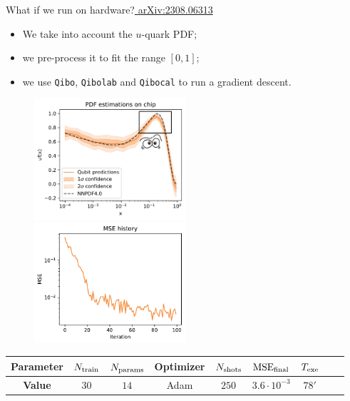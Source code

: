 \documentclass[8pt, xcolor={svgnames}, hyperref={linkcolor=black}]{beamer}
\begin{document}
\begin{frame}{What if we run on hardware?\hfill \href{https://arxiv.org/abs/2308.06313}{\faBook\,\,arXiv:2308.06313}}
\begin{itemize}[noitemsep]
\item[\faCrosshairs] We take into account the $u$-quark PDF;
\item[\faExpand] we pre-process it to fit the range $[0,1]$;
\item[\faGamepad] we use \texttt{Qibo}, \texttt{Qibolab} and \texttt{Qibocal} to run a gradient descent.
\end{itemize}
\begin{figure}  
  \includegraphics[width=0.5\textwidth]{figures/emo.png}%
  \includegraphics[width=0.5\textwidth]{figures/loss.pdf}%
\end{figure}
\begin{table}[ht]
\centering
\begin{tabular}{ccccccccc}
\hline \hline 
\rule{0pt}{2.5ex}
\textbf{Parameter} & $N_{\rm train}$ & $N_{\rm params}$ & Optimizer & $N_{\rm shots}$ & $\text{MSE}_{\rm final}$ & $T_{\rm exe}$ \\
\hline
\rule{0pt}{2.5ex}
\textbf{Value} & $30$ & $14$ & Adam & $250$ & $3.6\cdot 10^{-3}$ & $78'$ \\
\hline \hline 
\end{tabular}
\label{tab:qml}
\end{table}
\end{frame}
\end{document}
